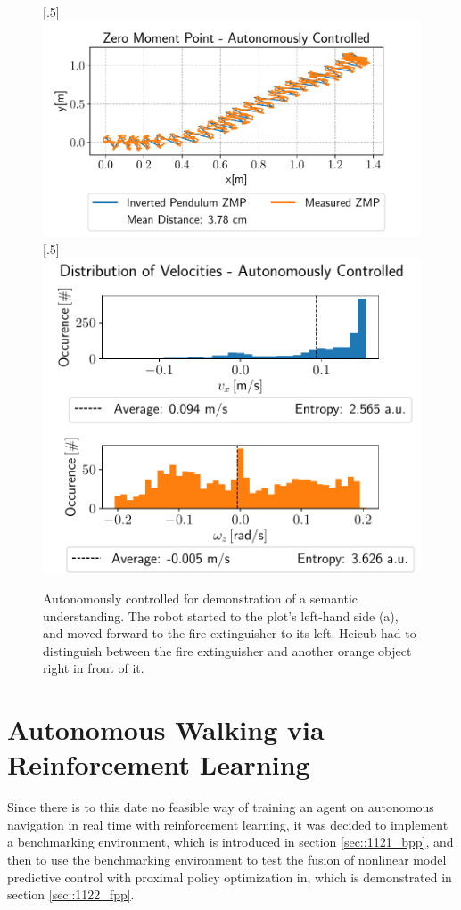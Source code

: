 \begin{figure}[h!]
	[.5\linewidth]{\includegraphics[scale=.45]{chapters/11_autonomous_walking_experiments/img/semantic_walk_01_zmp.pdf}}
	[.5\linewidth]{\includegraphics[scale=.45]{chapters/11_autonomous_walking_experiments/img/semantic_walk_01_entropy.pdf}}
	\caption{Autonomously controlled for demonstration of a semantic understanding. The robot started to the plot's left-hand side (a), and moved forward to the fire extinguisher to its left. Heicub had to distinguish between the fire extinguisher and another orange object right in front of it.}
	\label{fig::1112_aw_additional_semantic}
\end{figure}

\FloatBarrier
\section{Autonomous Walking via Reinforcement Learning}
\label{sec::112_ar}
Since there is to this date no feasible way of training an agent on autonomous navigation in real time with reinforcement learning, it was decided to implement a benchmarking environment, which is introduced in section \ref{sec::1121_bpp}, and then to use the benchmarking environment to test the fusion of nonlinear model predictive control with proximal policy optimization in, which is demonstrated in section \ref{sec::1122_fpp}.
\FloatBarrier

